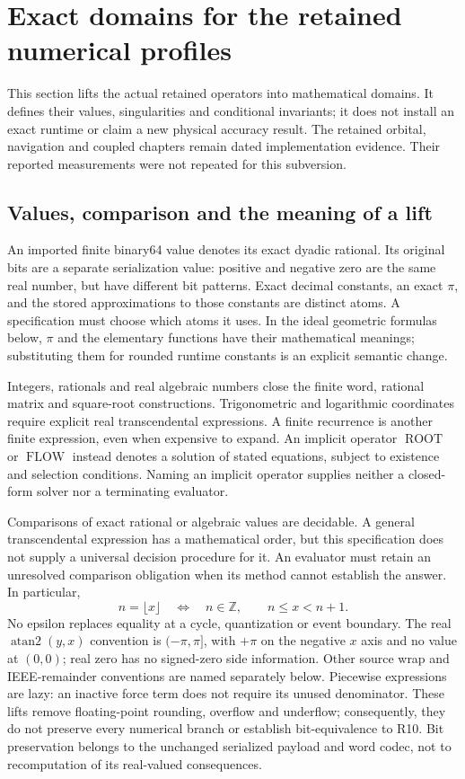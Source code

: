 \section{Exact domains for the retained numerical profiles}
\label{sec:exact-domains}
This section lifts the actual retained operators into mathematical domains. It
defines their values, singularities and conditional invariants; it does not
install an exact runtime or claim a new physical accuracy result. The retained
orbital, navigation and coupled chapters remain dated implementation evidence.
Their reported measurements were not repeated for this subversion.

\subsection{Values, comparison and the meaning of a lift}
\label{sec:lift-values}
An imported finite binary64 value denotes its exact dyadic rational. Its original
bits are a separate serialization value: positive and negative zero are the same
real number, but have different bit patterns. Exact decimal constants, an exact
$\pi$, and the stored approximations to those constants are distinct atoms. A
specification must choose which atoms it uses. In the ideal geometric formulas
below, $\pi$ and the elementary functions have their mathematical meanings;
substituting them for rounded runtime constants is an explicit semantic change.

Integers, rationals and real algebraic numbers close the finite word, rational
matrix and square-root constructions. Trigonometric and logarithmic coordinates
require explicit real transcendental expressions. A finite recurrence is another
finite expression, even when expensive to expand. An implicit operator
$\operatorname{ROOT}$ or $\operatorname{FLOW}$ instead denotes a solution of stated
equations, subject to existence and selection conditions. Naming an implicit
operator supplies neither a closed-form solver nor a terminating evaluator.

Comparisons of exact rational or algebraic values are decidable. A general
transcendental expression has a mathematical order, but this specification does
not supply a universal decision procedure for it. An evaluator must retain an
unresolved comparison obligation when its method cannot establish the answer.
In particular,
\begin{equation}
 n=\lfloor x\rfloor\quad\Longleftrightarrow\quad n\in\mathbb Z,
 \qquad n\le x<n+1 .
\end{equation}
No epsilon replaces equality at a cycle, quantization or event boundary.
The real $\operatorname{atan2}(y,x)$ convention is $(-\pi,\pi]$, with $+\pi$
on the negative $x$ axis and no value at $(0,0)$; real zero has no signed-zero
side information. Other source wrap and IEEE-remainder conventions are named
separately below.
Piecewise expressions are lazy: an inactive force term does not require its
unused denominator. These lifts remove floating-point rounding, overflow and
underflow; consequently, they do not preserve every numerical branch or establish
bit-equivalence to R10. Bit preservation belongs to the unchanged serialized
payload and word codec, not to recomputation of its real-valued consequences.


